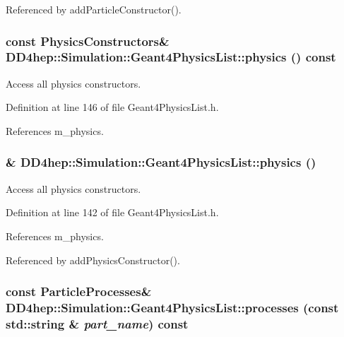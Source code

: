 Referenced by addParticleConstructor().\hypertarget{class_d_d4hep_1_1_simulation_1_1_geant4_physics_list_aff2be21114872cdd3f1450b6fcf9996f}{
\subsubsection[{physics}]{\setlength{\rightskip}{0pt plus 5cm}const {\bf PhysicsConstructors}\& DD4hep::Simulation::Geant4PhysicsList::physics () const}}
\label{class_d_d4hep_1_1_simulation_1_1_geant4_physics_list_aff2be21114872cdd3f1450b6fcf9996f}


Access all physics constructors. 

Definition at line 146 of file Geant4PhysicsList.h.

References m\_\-physics.\hypertarget{class_d_d4hep_1_1_simulation_1_1_geant4_physics_list_a02c18b4acdacd390c3c1b1c4609f1c7b}{
\subsubsection[{physics}]{\& DD4hep::Simulation::Geant4PhysicsList::physics ()}}
\label{class_d_d4hep_1_1_simulation_1_1_geant4_physics_list_a02c18b4acdacd390c3c1b1c4609f1c7b}


Access all physics constructors. 

Definition at line 142 of file Geant4PhysicsList.h.

References m\_\-physics.

Referenced by addPhysicsConstructor().\hypertarget{class_d_d4hep_1_1_simulation_1_1_geant4_physics_list_a04db5f0353e6f8188c8c2a3e21396a3d}{
\subsubsection[{processes}]{\setlength{\rightskip}{0pt plus 5cm}const {\bf ParticleProcesses}\& DD4hep::Simulation::Geant4PhysicsList::processes (const std::string \& {\em part\_\-name}) const}}
\label{class_d_d4hep_1_1_simulation_1_1_geant4_physics_list_a04db5f0353e6f8188c8c2a3e21396a3d}


